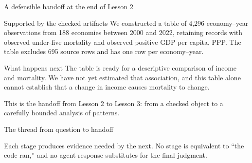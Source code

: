 \begin{frame}{A defensible handoff at the end of Lesson 2}
  \begin{block}{Supported by the checked artifacts}
    We constructed a table of 4,296 economy--year observations from 188
    economies between 2000 and 2022, retaining records with observed
    under-five mortality and observed positive GDP per capita, PPP. The table
    excludes 695 source rows and has one row per economy--year.
  \end{block}

  \begin{block}{What happens next}
    The table is ready for a descriptive comparison of income and mortality.
    We have not yet estimated that association, and this table alone cannot
    establish that a change in income causes mortality to change.
  \end{block}

  \vfill
  This is the handoff from Lesson 2 to Lesson 3: from a checked object to a
  carefully bounded analysis of patterns.
\end{frame}

\begin{frame}{The thread from question to handoff}
  \centering

  \vspace{1.0em}
  Each stage produces evidence needed by the next. No stage is equivalent to
  ``the code ran,'' and no agent response substitutes for the final judgment.
\end{frame}

